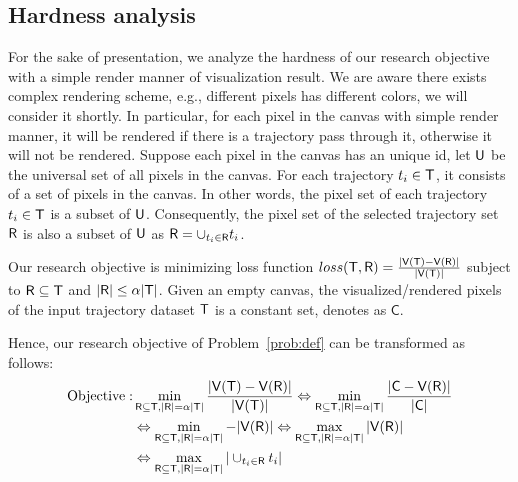 


\subsection{Hardness analysis}\label{sec:hard}
For the sake of presentation, we analyze the hardness of our research objective with a simple render manner of visualization result.
We are aware there exists complex rendering scheme, e.g., different pixels has different colors, we will consider it shortly.
In particular, for each pixel in the canvas with simple render manner, it will be rendered if there is a trajectory pass through it, otherwise it will not be rendered.
Suppose each pixel in the canvas has an unique id, let $\mathsf{U}$ be the universal set of all pixels in the canvas.
For each trajectory $t_i \in \mathsf{T}$, it consists of a set of pixels in the canvas.
In other words, the pixel set of each trajectory $t_i \in \mathsf{T}$ is a subset of $\mathsf{U}$.
Consequently, the pixel set of the selected trajectory set $\mathsf{R}$ is also a subset of $\mathsf{U}$ as $\mathsf{R} = \cup_{t_i \in \mathsf{R}} t_i$.


Our research objective is minimizing loss function $loss(\mathsf{T}, \mathsf{R}) =  \frac{|\mathsf{V}(\mathsf{T}) - \mathsf{V}(\mathsf{R})|}{|\mathsf{V}(\mathsf{T})|}$ subject to $\mathsf{R} \subseteq \mathsf{T}$ and $|\mathsf{R}| \leq \alpha |\mathsf{T}|$.
Given an empty canvas, the visualized/rendered pixels of the input trajectory dataset $\mathsf{T}$ is a constant set, denotes as $\mathsf{C}$.

Hence, our research objective of Problem~\ref{prob:def} can be transformed as follows:
\begin{align}\label{eqn:obj2} \nonumber
\text{Objective}: & \min_{\oR \subseteq \D, |\oR| = \alpha |\D|}  \frac{|\V(\D) - \V(\oR)|}{|\V(\D)|} \Leftrightarrow \min_{\oR \subseteq \D, |\oR| = \alpha |\D|}  \frac{|\mathsf{C} - \V(\oR)|}{|\mathsf{C}|}  \\ \nonumber %
& \Leftrightarrow \min_{\oR \subseteq \D, |\oR| = \alpha |\D|}   - |\V(\oR)| \Leftrightarrow \max_{\oR \subseteq \D, |\oR| = \alpha |\D|}  |\V(\oR)|  \\ \nonumber
& \Leftrightarrow \max_{\oR \subseteq \D, |\oR| = \alpha |\D|} | \cup_{t_i \in \oR} t_i |
\end{align}

